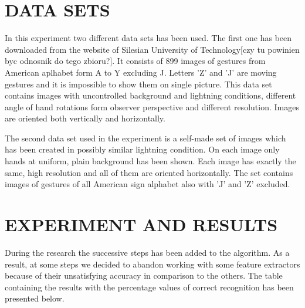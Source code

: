 \documentclass[11pt,a4paper]{article}
\begin{document}
\section{DATA SETS}

	In this experiment two different data sets has been used. The first one has been downloaded from the website of Silesian University of Technology[czy tu powinien byc odnosnik do tego zbioru?]. It consists of 899 images of gestures from American aplhabet form A to Y excluding J. Letters 'Z' and 'J' are moving gestures and it is impossible to show them on single picture. This data set contains images with uncontrolled background and lightning conditions, different angle of hand rotations form observer perspective and different resolution. Images are oriented both vertically and horizontally.
	
	The second data set used in the experiment is a self-made set of images which has been created in possibly similar lightning condition. On each image only hands at uniform, plain background has been shown. Each image has exactly the same, high resolution and all of them are oriented horizontally. The set contains images of gestures of all American sign alphabet also with 'J' and 'Z' excluded.



\section{EXPERIMENT AND RESULTS}

During the research the successive steps has been added to the algorithm. As a result, at some steps we decided to abandon working with some feature extractors because of their unsatisfying accuracy in comparison to the others. The table containing the results with the percentage values of correct recognition has been presented below.
\end{document}
